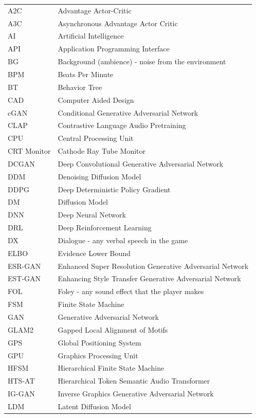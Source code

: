 \documentclass[a4paper,one side,12pt]{book}
\begin{document}
\begin{longtable} {m{10em} m{20em}}
  A2C& Advantage Actor-Critic\\
A3C& Asynchronous Advantage Actor Critic \\
AI & Artificial Intelligence\\
API&Application Programming Interface\\
BG & Background (ambience) - noise from the environment\\
BPM&Beats Per Minute\\
BT& Behavior Tree\\
CAD&Computer Aided Design\\
cGAN&Conditional Generative Adversarial Network\\
CLAP&Contrastive Language Audio Pretraining\\
CPU& Central Processing Unit\\
CRT Monitor & Cathode Ray Tube Monitor\\
DCGAN& Deep Convolutional Generative Adversarial Network\\
DDM& Denoising Diffusion Model\\
DDPG&Deep Deterministic Policy Gradient\\
DM& Diffusion Model\\
DNN& Deep Neural Network\\
DRL& Deep Reinforcement Learning\\
DX & Dialogue - any verbal speech in the game\\
ELBO& Evidence Lower Bound\\
ESR-GAN& Enhanced Super Resolution Generative Adversarial Network\\
EST-GAN& Enhancing Style Transfer Generative Adversarial Network\\
FOL & Foley - any sound effect that the player makes\\
FSM& Finite State Machine\\
GAN& Generative Adversarial Network\\
GLAM2&Gapped Local Alignment of Motifs\\
GPS&Global Positioning System\\
GPU&Graphics Processing Unit\\
HFSM& Hierarchical Finite State Machine\\
HTS-AT&Hierarchical Token Semantic Audio Transformer\\
IG-GAN& Inverse Graphics Generative Adversarial Network\\
LDM& Latent Diffusion Model\\

\end{longtable}
\end{document}
